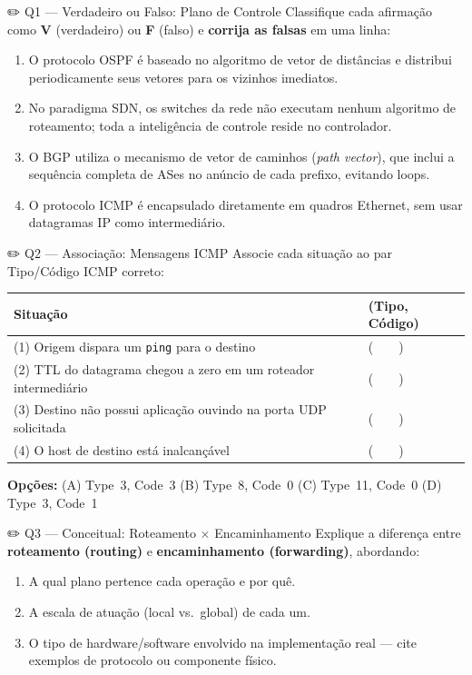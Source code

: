 \documentclass[11pt,a4paper]{article}
\begin{document}
\begin{questao}{✏️ Q1 --- Verdadeiro ou Falso: Plano de Controle}
Classifique cada afirmação como \textbf{V} (verdadeiro) ou \textbf{F} (falso) e \textbf{corrija as falsas} em uma linha:
\begin{enumerate}[label=(\alph*)]
    \item O protocolo OSPF é baseado no algoritmo de vetor de distâncias e distribui periodicamente seus vetores para os vizinhos imediatos.
    \item No paradigma SDN, os switches da rede não executam nenhum algoritmo de roteamento; toda a inteligência de controle reside no controlador.
    \item O BGP utiliza o mecanismo de vetor de caminhos (\textit{path vector}), que inclui a sequência completa de ASes no anúncio de cada prefixo, evitando loops.
    \item O protocolo ICMP é encapsulado diretamente em quadros Ethernet, sem usar datagramas IP como intermediário.
\end{enumerate}
\end{questao}

\begin{questao}{✏️ Q2 --- Associação: Mensagens ICMP}
Associe cada situação ao par Tipo/Código ICMP correto:

\begin{center}
\begin{tabular}{ll}
\toprule
\textbf{Situação} & \textbf{(Tipo, Código)} \\
\midrule
(1) Origem dispara um \texttt{ping} para o destino & (~~~~) \\
(2) TTL do datagrama chegou a zero em um roteador intermediário & (~~~~) \\
(3) Destino não possui aplicação ouvindo na porta UDP solicitada & (~~~~) \\
(4) O host de destino está inalcançável & (~~~~) \\
\bottomrule
\end{tabular}
\end{center}
\textbf{Opções:} \quad (A) Type~3, Code~3 \quad (B) Type~8, Code~0 \quad (C) Type~11, Code~0 \quad (D) Type~3, Code~1
\end{questao}

\begin{questao}{✏️ Q3 --- Conceitual: Roteamento $\times$ Encaminhamento}
Explique a diferença entre \textbf{roteamento (routing)} e \textbf{encaminhamento (forwarding)}, abordando:
\begin{enumerate}[label=(\alph*)]
    \item A qual plano pertence cada operação e por quê.
    \item A escala de atuação (local vs.\ global) de cada um.
    \item O tipo de hardware/software envolvido na implementação real --- cite exemplos de protocolo ou componente físico.
\end{enumerate}
\end{questao}
\end{document}
